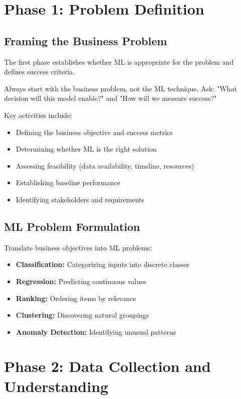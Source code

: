 \section{Phase 1: Problem Definition}

\subsection{Framing the Business Problem}

The first phase establishes whether ML is appropriate for the problem and defines success criteria.

\begin{bestpractice}
Always start with the business problem, not the ML technique. Ask: "What decision will this model enable?" and "How will we measure success?"
\end{bestpractice}

Key activities include:
\begin{itemize}
    \item Defining the business objective and success metrics
    \item Determining whether ML is the right solution
    \item Assessing feasibility (data availability, timeline, resources)
    \item Establishing baseline performance
    \item Identifying stakeholders and requirements
\end{itemize}

\subsection{ML Problem Formulation}

Translate business objectives into ML problems:

\begin{itemize}
    \item \textbf{Classification:} Categorizing inputs into discrete classes
    \item \textbf{Regression:} Predicting continuous values
    \item \textbf{Ranking:} Ordering items by relevance
    \item \textbf{Clustering:} Discovering natural groupings
    \item \textbf{Anomaly Detection:} Identifying unusual patterns
\end{itemize}

\section{Phase 2: Data Collection and Understanding}

